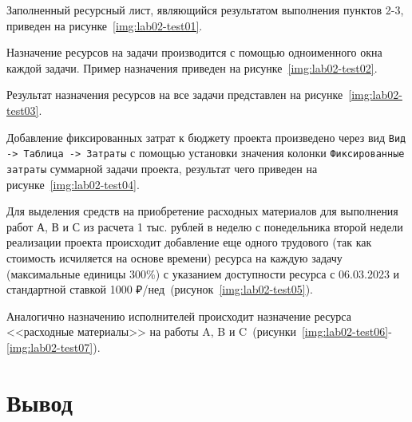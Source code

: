 Заполненный ресурсный лист, являющийся результатом выполнения пунктов 2-3,
приведен на рисунке~\ref{img:lab02-test01}.


Назначение ресурсов на задачи производится с помощью одноименного окна каждой
задачи. Пример назначения приведен на рисунке~\ref{img:lab02-test02}.


Результат назначения ресурсов на все задачи представлен на рисунке~\ref{img:lab02-test03}.


Добавление фиксированных затрат к бюджету проекта произведено через вид
\texttt{Вид -> Таблица -> Затраты} с помощью установки значения колонки
\texttt{Фиксированные затраты} суммарной задачи проекта, результат чего
приведен на рисунке~\ref{img:lab02-test04}.


Для выделения средств на приобретение расходных материалов для выполнения работ
А, В и С из расчета 1 тыс. рублей в неделю с понедельника второй недели
реализации проекта происходит добавление еще одного трудового (так как
стоимость исчиляется на основе времени) ресурса на каждую задачу (максимальные
единицы 300\%) с указанием доступности ресурса с 06.03.2023 и стандартной
ставкой 1000 ₽/нед~(рисунок~\ref{img:lab02-test05}).


Аналогично назначению исполнителей происходит назначение ресурса <<расходные
материалы>> на работы A, B и C~(рисунки~\ref{img:lab02-test06}-\ref{img:lab02-test07}).




\section*{Вывод}

